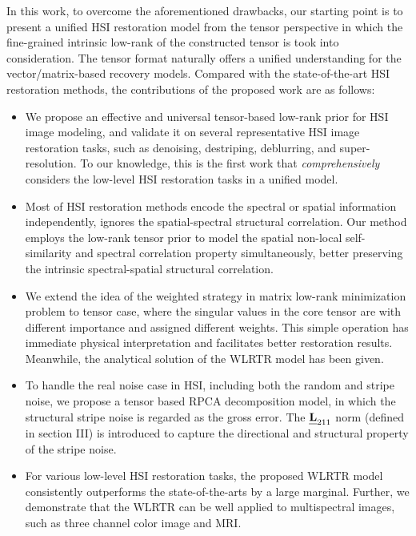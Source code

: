 \documentclass[twocolumn]{svjour3}          %
\begin{document}
  In this work, to overcome the aforementioned drawbacks, our starting point is to present a unified HSI restoration model from the tensor perspective in which the fine-grained intrinsic low-rank of the constructed tensor is took into consideration. The tensor format naturally offers a unified understanding for the vector/matrix-based recovery models. Compared with the state-of-the-art HSI restoration methods, the contributions of the proposed work are as follows:
  \begin{itemize}
    \item We propose an effective and universal tensor-based low-rank prior for HSI image modeling, and validate it on several representative HSI image restoration tasks, such as denoising, destriping, deblurring, and super-resolution. To our knowledge, this is the first work that \emph{comprehensively} considers the low-level HSI restoration tasks in a unified model.
    \item Most of HSI restoration methods encode the spectral or spatial information independently, ignores the spatial-spectral structural correlation. Our method employs the low-rank tensor prior to model the spatial non-local self-similarity and spectral correlation property simultaneously, better preserving the intrinsic spectral-spatial structural correlation.
    \item We extend the idea of the weighted strategy in matrix low-rank minimization problem \cite{Gu2014Weighted} to tensor case, where the singular values in the core tensor are with different importance and assigned different weights. This simple operation has immediate physical interpretation and facilitates better restoration results. Meanwhile, the analytical solution of the WLRTR model has been given.
    \item To handle the real noise case in HSI, including both the random and stripe noise, we propose a tensor based RPCA decomposition model, in which the structural stripe noise is regarded as the gross error. The $\textbf{\emph{L}}_{211}$ norm (defined in section III) is introduced to capture the directional and structural property of the stripe noise.
    \item For various low-level HSI restoration tasks, the proposed WLRTR model consistently outperforms the state-of-the-arts by a large marginal. Further, we demonstrate that the WLRTR can be well applied to multispectral images, such as three channel color image and MRI.
  \end{itemize}
\end{document}
